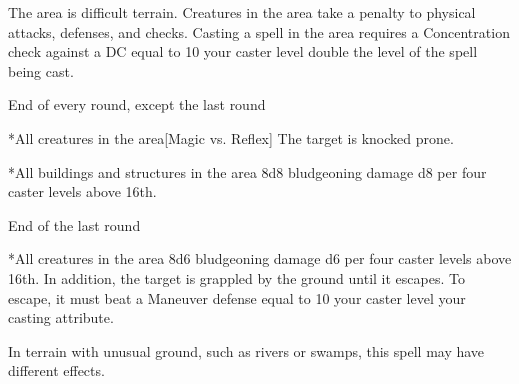 \begin{spellheader}
\end{spellheader}
\begin{spelleffects}
    \spellline
    \spelleffect The area is difficult terrain. Creatures in the area take a  penalty to physical attacks, defenses, and checks. Casting a spell in the area requires a Concentration check against a DC equal to 10 \add your caster level \add double the level of the spell being cast.
    \begin{spelltrigger}{End of every round, except the last round}
        \begin{spelltarget}*{All creatures in the area}[Magic vs. Reflex]
            \spellsuccess The target is knocked prone.
        \end{spelltarget}
        \begin{spelltarget}*{All buildings and structures in the area}
            \spelleffect 8d8 bludgeoning damage \add d8 per four caster levels above 16th.
        \end{spelltarget}
    \end{spelltrigger}
    \begin{spelltrigger}{End of the last round}
        \begin{spelltarget}*{All creatures in the area}
            \spelleffect 8d6 bludgeoning damage \add d6 per four caster levels above 16th. In addition, the target is grappled by the ground until it escapes. To escape, it must beat a Maneuver defense equal to 10 \add your caster level \add your casting attribute.
        \end{spelltarget}
    \end{spelltrigger}
\end{spelleffects}
\begin{spellfooter}
    \spellnotes In terrain with unusual ground, such as rivers or swamps, this spell may have different effects.
\end{spellfooter}

